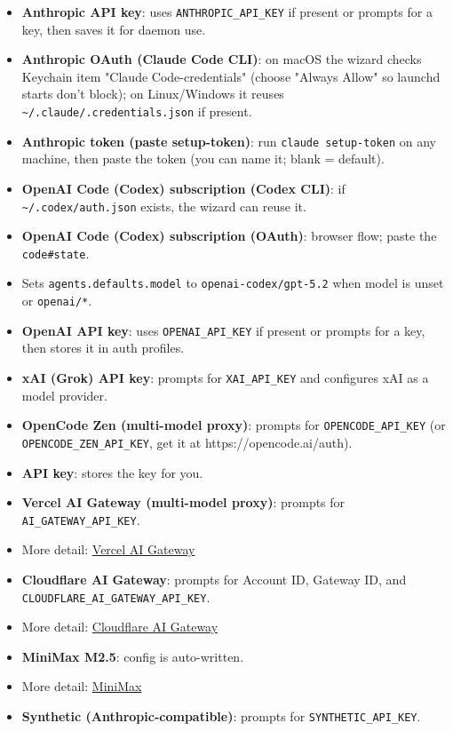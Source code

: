 \begin{itemize}
  \item \textbf{Anthropic API key}: uses \texttt{ANTHROPIC\_API\_KEY} if present or prompts for a key, then saves it for daemon use.
  \item \textbf{Anthropic OAuth (Claude Code CLI)}: on macOS the wizard checks Keychain item "Claude Code-credentials" (choose "Always Allow" so launchd starts don't block); on Linux/Windows it reuses \texttt{\textasciitilde{}/.claude/.credentials.json} if present.
  \item \textbf{Anthropic token (paste setup-token)}: run \texttt{claude setup-token} on any machine, then paste the token (you can name it; blank = default).
  \item \textbf{OpenAI Code (Codex) subscription (Codex CLI)}: if \texttt{\textasciitilde{}/.codex/auth.json} exists, the wizard can reuse it.
  \item \textbf{OpenAI Code (Codex) subscription (OAuth)}: browser flow; paste the \texttt{code\#state}.
  \item Sets \texttt{agents.defaults.model} to \texttt{openai-codex/gpt-5.2} when model is unset or \texttt{openai/*}.
  \item \textbf{OpenAI API key}: uses \texttt{OPENAI\_API\_KEY} if present or prompts for a key, then stores it in auth profiles.
  \item \textbf{xAI (Grok) API key}: prompts for \texttt{XAI\_API\_KEY} and configures xAI as a model provider.
  \item \textbf{OpenCode Zen (multi-model proxy)}: prompts for \texttt{OPENCODE\_API\_KEY} (or \texttt{OPENCODE\_ZEN\_API\_KEY}, get it at https://opencode.ai/auth).
  \item \textbf{API key}: stores the key for you.
  \item \textbf{Vercel AI Gateway (multi-model proxy)}: prompts for \texttt{AI\_GATEWAY\_API\_KEY}.
  \item More detail: \href{/providers/vercel-ai-gateway}{Vercel AI Gateway}
  \item \textbf{Cloudflare AI Gateway}: prompts for Account ID, Gateway ID, and \texttt{CLOUDFLARE\_AI\_GATEWAY\_API\_KEY}.
  \item More detail: \href{/providers/cloudflare-ai-gateway}{Cloudflare AI Gateway}
  \item \textbf{MiniMax M2.5}: config is auto-written.
  \item More detail: \href{/providers/minimax}{MiniMax}
  \item \textbf{Synthetic (Anthropic-compatible)}: prompts for \texttt{SYNTHETIC\_API\_KEY}.

\end{itemize}
